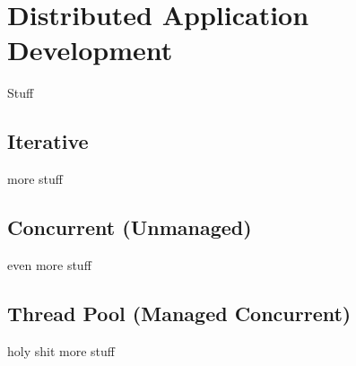\section{Distributed Application Development}
Stuff
\subsection{Iterative}
more stuff
\subsection{Concurrent (Unmanaged)}
even more stuff
\subsection{Thread Pool (Managed Concurrent)}
holy shit more stuff